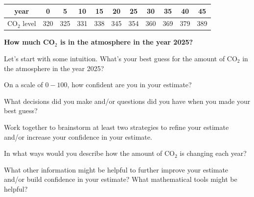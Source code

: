 \documentclass[10pt]{article}
\begin{document}
\begin{center}
\begin{tabular}{|c|c|c|c|c|c|c|c|c|c|c|}
\hline
year & 0 & 5 & 10 & 15 & 20 & 25 & 30 & 35 & 40 & 45 \\
\hline
CO$_2$ level & 320 & 325 & 331 & 338 & 345 & 354 & 360 & 369 & 379 & 389 \\
\hline
\end{tabular}
\end{center}

{\bf How much  CO$_2$ is in the atmosphere in the year 2025?}

Let's start with some intuition.  What's your best guess for the amount of CO$_2$ in the atmosphere in the year 2025?  

\vspace{5cm}

On a scale of $0-100$, how confident are you in your estimate? 

\newpage

What decisions did you make and/or questions did you have when you made your best guess? 

\vfill

Work together to brainstorm at least two strategies to refine your estimate and/or increase your confidence in your estimate. 

\vfill

In what ways would you describe how the amount of CO$_2$ is changing each year?
\vfill

What other information might be helpful to further improve your estimate and/or build confidence in your estimate? What mathematical tools might be helpful?

\vfill
\end{document}
